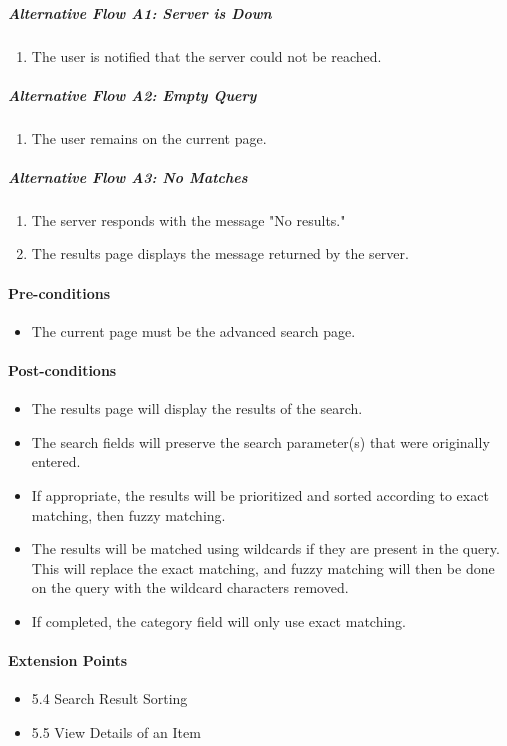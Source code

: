 \documentclass{article}
\begin{document}
\subparagraph{Alternative Flow A1: Server is Down}
\begin{enumerate}
\item The user is notified that the server could not be reached.
\end{enumerate}

\subparagraph{Alternative Flow A2: Empty Query}
\begin{enumerate}
\item The user remains on the current page.
\end{enumerate}

\subparagraph{Alternative Flow A3: No Matches}
\begin{enumerate}
\item The server responds with the message "No results."
\item The results page displays the message returned by the server.
\end{enumerate}

\paragraph{Pre-conditions}
\begin{itemize}
\item The current page must be the advanced search page.
\end{itemize}

\paragraph{Post-conditions}
\begin{itemize}
\item The results page will display the results of the search.
\item The search fields will preserve the search parameter(s) that were originally entered.
\item If appropriate, the results will be prioritized and sorted according to exact matching, then fuzzy matching.
\item The results will be matched using wildcards if they are present in the query.  This will replace the exact matching, and fuzzy matching will then be done on the query with the wildcard characters removed.
\item If completed, the category field will only use exact matching.
\end{itemize}

\paragraph{Extension Points}
\begin{itemize}
\item 5.4 Search Result Sorting
\item 5.5 View Details of an Item
\end{itemize}
\end{document}
